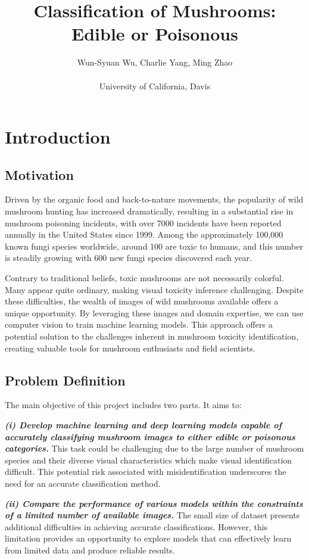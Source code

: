 \documentclass{article}
\title{Classification of Mushrooms: Edible or Poisonous}
\author{
Wun-Syuan Wu, Charlie Yang, Ming Zhao 
    \\
    \\
  University of California, Davis}
\begin{document}
\maketitle

\section{Introduction}
\subsection{Motivation}

Driven by the organic food and back-to-nature movements, the popularity of wild mushroom hunting has increased dramatically\cite{Eren2010}, resulting in a substantial rise in mushroom poisoning incidents, with over 7000 incidents have been reported annually in the United States since 1999\cite{Brandenburg2018}. Among the approximately 100,000 known fungi species worldwide, around 100 are toxic to humans\cite{Graeme2014}, and this number is steadily growing with 600 new fungi species discovered each year\cite{Lima2012}.

Contrary to traditional beliefs, toxic mushrooms are not necessarily colorful. Many appear quite ordinary, making visual toxicity inference challenging. Despite these difficulties, the wealth of images of wild mushrooms available offers a unique opportunity. By leveraging these images and domain expertise, we can use computer vision to train machine learning models. This approach offers a potential solution to the challenges inherent in mushroom toxicity identification, creating valuable tools for mushroom enthusiasts and field scientists.

\subsection{Problem Definition}

The main objective of this project includes two parts. It aims to:

\textbf{\emph{(i) Develop machine learning and deep learning models capable of accurately classifying mushroom images to either edible or poisonous categories.}} This task could be challenging due to the large number of mushroom species and their diverse visual characteristics which make visual identification difficult. This potential risk associated with misidentification underscores the need for an accurate classification method.

\textbf{\emph{(ii) Compare the performance of various models within the constraints of a limited number of available images.}} The small size of dataset presents additional difficulties in achieving accurate classifications. However, this limitation provides an opportunity to explore models that can effectively learn from limited data and produce reliable results.
\end{document}
